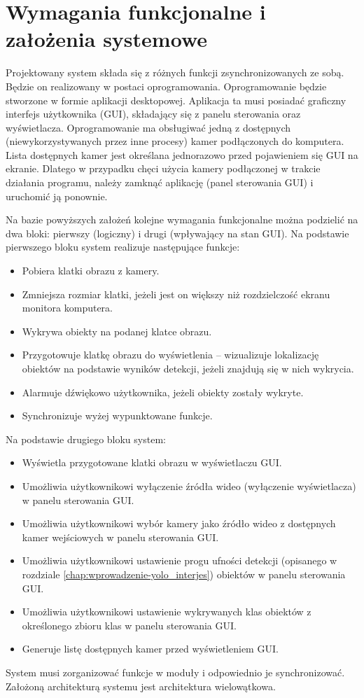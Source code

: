 \section{Wymagania funkcjonalne i założenia systemowe}
\label{chap:wymagania-funcjonalne}
Projektowany system składa się z różnych funkcji zsynchronizowanych ze sobą. Będzie on realizowany w postaci oprogramowania. 
Oprogramowanie będzie stworzone w formie aplikacji desktopowej. Aplikacja ta musi posiadać graficzny interfejs użytkownika (GUI), składający się z panelu sterowania oraz wyświetlacza. 
Oprogramowanie ma obsługiwać jedną z dostępnych (niewykorzystywanych przez inne procesy) kamer podłączonych do komputera. Lista dostępnych kamer jest określana jednorazowo przed pojawieniem się GUI na ekranie. Dlatego w przypadku chęci użycia kamery podłączonej w trakcie działania programu, należy zamknąć aplikację (panel sterowania GUI) i uruchomić ją ponownie.

Na bazie powyższych założeń kolejne wymagania funkcjonalne można podzielić na dwa bloki: pierwszy (logiczny) i drugi (wpływający na stan GUI). Na podstawie pierwszego bloku system realizuje następujące funkcje:
\begin{itemize}
    \item Pobiera klatki obrazu z kamery.
    \item Zmniejsza rozmiar klatki, jeżeli jest on większy niż rozdzielczość ekranu monitora komputera.
    \item Wykrywa obiekty na podanej klatce obrazu.
    \item Przygotowuje klatkę obrazu do wyświetlenia -- wizualizuje lokalizację obiektów na podstawie wyników detekcji, jeżeli znajdują się w nich wykrycia.
    \item Alarmuje dźwiękowo użytkownika, jeżeli obiekty zostały wykryte.
    \item Synchronizuje wyżej wypunktowane funkcje.
\end{itemize}

Na podstawie drugiego bloku system:
\begin{itemize}
        \item Wyświetla przygotowane klatki obrazu w wyświetlaczu GUI.
        \item Umożliwia użytkownikowi wyłączenie źródła wideo (wyłączenie wyświetlacza) w panelu sterowania GUI.
        \item Umożliwia użytkownikowi wybór kamery jako źródło wideo z dostępnych kamer wejściowych w panelu sterowania GUI.
        \item Umożliwia użytkownikowi ustawienie progu ufności detekcji (opisanego w rozdziale \ref{chap:wprowadzenie-yolo_interjes}) obiektów w panelu sterowania GUI.
        \item Umożliwia użytkownikowi ustawienie wykrywanych klas obiektów z określonego zbioru klas w panelu sterowania GUI.
        \item Generuje listę dostępnych kamer przed wyświetleniem GUI.
\end{itemize}

System musi zorganizować funkcje w moduły i odpowiednio je synchronizować. Założoną architekturą systemu jest architektura wielowątkowa. 